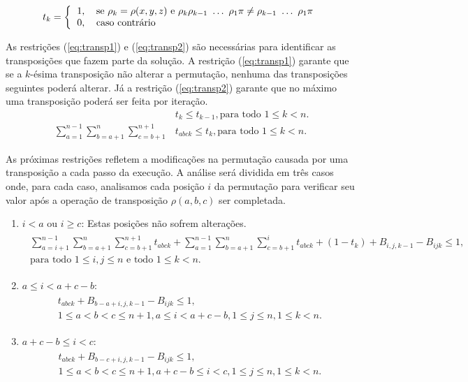 \[ 
  t_{k} = \left \{ 
  \begin{tabular}{ll} 
  1, & se $\rho_{k} = \rho(x,y,z)$ e
  $\rho_{k} \rho_{k-1}~\ldots~\rho_{1} \pi \neq \rho_{k-1}~\ldots~\rho_{1} \pi$\\
  0, & caso contrário 
  \end{tabular} \right .
\]

As restrições (\ref{eq:transp1}) e (\ref{eq:transp2}) são necessárias
para identificar as transposições que fazem parte da solução. A
restrição (\ref{eq:transp1}) garante que se a $k$-ésima transposição
não alterar a permutação, nenhuma das transposições seguintes poderá
alterar. Já a restrição (\ref{eq:transp2}) garante que no máximo uma
transposição poderá ser feita por iteração.
\begin{align}
  &t_{k} \le t_{k-1}, \text{para todo $1 \le k <
  n$}. \label{eq:transp1} \\
  \sum_{a=1}^{n-1}\sum_{b=a+1}^{n}\sum_{c=b+1}^{n+1} &t_{abck} \le
  t_{k} , \text{para todo $1 \le k <
  n$}. \label{eq:transp2} 
\end{align}

As próximas restrições refletem a modificações na permutação causada
por uma transposição a cada passo da execução. A análise será dividida em
três casos onde, para cada caso, analisamos cada posição $i$ da
permutação para verificar seu valor após a operação de transposição
$\rho(a,b,c)$ ser completada.
\begin{enumerate}
\item{$i < a$ ou $i \ge c$:
Estas posições não sofrem alterações.
\begin{align}
  \begin{split} \sum_{a=i+1}^{n-1}\sum_{b=a+1}^{n}\sum_{c=b+1}^{n+1}
  t_{abck} + \sum_{a=1}^{n-1}\sum_{b=a+1}^{n}\sum_{c=b+1}^{i} t_{abck}
  + (1 - t_{k}) + B_{i,j,k-1} - B_{ijk} \le 1, \\ \text{para todo
  $1 \le i, j \le n$ e todo $1 \le k <
  n$}.  \end{split} \label{eq:transp3}
\end{align}}
\item{$a \le i < a + c -b$:
\begin{align}
  \begin{split}
  t_{abck} + B_{b-a+i,j,k-1} - B_{ijk} \le 1, \\
  \text{$1 \le a < b < c \le n + 1, a \le i < a + c -b, 1 \le j
  \le n, 1 \le k < n$}.
  \end{split}
  \label{eq:transp4}
\end{align}}
\item{$a + c - b \le i < c$:
\begin{align}
  \begin{split}
  t_{abck} + B_{b-c+i,j,k-1} - B_{ijk} \le 1, \\
  \text{$1 \le a < b < c \le n + 1, a + c - b \le i < c, 1 \le j
  \le n, 1 \le k < n$}.  
  \end{split}
  \label{eq:transp5}
\end{align}}
\end{enumerate}
